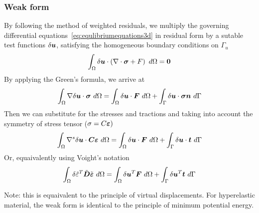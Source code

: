 \subsubsection{Weak form}

  By following the method of weighted residuals, we multiply the governing differential equations~\ref{eq:equlibriumequations3d} in residual form by a sutable test functions $\delta\mbox{\boldmath$u$}$, satisfying the homogeneous boundary conditions on $\Gamma_u$
  $$
  \int_\Omega \delta\mbox{\boldmath$u$} \cdot \left(
  \nabla\cdot\mbox{\boldmath$\sigma$} + F \right)\ d\Omega = \mbox{\boldmath$0$}
  $$
  By applying the Green's formula, we arrive at
  $$
  \int_\Omega\grad\delta\mbf{u}\cdot\mbf{\sigma}\ d\Omega =
  \int_\Omega\delta\mbf{u}\cdot\mbf{F}\ d\Omega + \int_\Gamma\delta\mbf{u}\cdot\mbf{\sigma}\mbf{n}\ d\Gamma
  $$
  Then we can substitute for the stresses and tractions and taking into account the symmetry of stress tensor ($\sigma=C\mbox{\boldmath$\varepsilon$})$
  \begin{equation}
  \int_\Omega\grad^s\delta\mbf{u}\cdot\mbf{C}\mbf{\eps}\ d\Omega =
  \int_\Omega\delta\mbf{u}\cdot\mbf{F}\ d\Omega + \int_\Gamma\delta\mbf{u}\cdot\mbf{t}\ d\Gamma
  \label{weakform3d}
  \end{equation}
  Or, equaivalently using Voight's notation
  \begin{equation}
  \int_\Omega\delta\tilde{\eps}^T\tilde{\mbf{D}}\tilde{\mbf{\eps}}\ d\Omega =
  \int_\Omega\delta\mbf{u}^T\mbf{F}\ d\Omega + \int_\Gamma\delta\mbf{u}^T\mbf{t}\ d\Gamma
  \label{eq:weakformvoight}
  \end{equation}
  
  Note: this is equaivalent to the principle of virtual displacements. For hyperelastic material, the weak form is identical to the principle of minimum potential energy.

  
